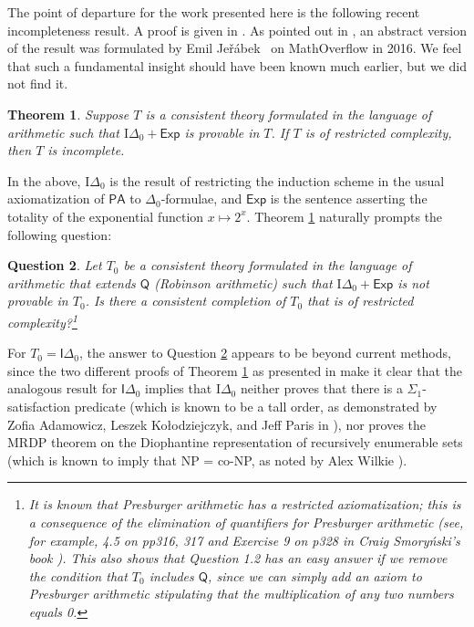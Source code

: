 \documentclass{amsart}
\newcommand{\qee} {\hspace*{2mm}\hfill \ding{109}}
\newtheorem{theorem}{Theorem}[section]
\newtheorem{jques}[theorem]{Question}
\newenvironment{jquestion}{\begin{jques} \rm}{\qee\end{jques}}
\newcommand{\jer}{Je\v{r}\'abek}
\newcommand{\skippy}{}
\begin{document}
\skippy
The point of departure for the work presented here is the following recent incompleteness result. A proof is given in \cite [Theorem B]{Enayat-Visser2024}. 
As pointed out in \cite {Enayat-Visser2024}, an abstract version of the result was formulated by Emil \jer~ on MathOverflow in 2016.
We feel that such a fundamental insight should have been known much earlier, but we did not find it.


\begin{theorem} \label{motivatingTheorem}  Suppose $T$ is a consistent theory formulated in the language of arithmetic such that $\mathrm{I}\Delta _{0}+\mathsf{Exp}$ is provable in $T$. If $T$ is of restricted complexity, then $T$ is incomplete.
\end{theorem}

\noindent In the above, $\mathrm{I}\Delta _{0}$ is the result of restricting the induction scheme in the usual axiomatization of $\mathsf{PA}$ to $\Delta _{0}$-formulae, and $\mathsf{Exp}$ is the sentence asserting the totality of the exponential function $x\mapsto 2^{x}$. Theorem \ref{motivatingTheorem} naturally prompts the following question: 

\begin{jquestion} \label{motivatingQ}
Let $T_{0}$ be a consistent  theory formulated in the language of
arithmetic that extends $\mathsf{Q}$ (Robinson arithmetic) such that  $\mathrm{I}\Delta _{0}+\mathsf{Exp}$ is not provable in 
$T_{0}$\textsf{.} Is there a consistent completion of $T_{0}$ that is of restricted complexity?\footnote{It is known that Presburger arithmetic has a restricted axiomatization; this is a consequence of the elimination of quantifiers for Presburger arithmetic (see, for example, 4.5 on pp316, 317 and Exercise 9 on p328 in Craig Smory\'nski's book \cite{Smorynski_Logical_NT}). This also shows that  Question 1.2 has an easy answer if we remove the condition that $T_0$ includes $\mathsf{Q}$, since we can simply add an axiom to Presburger arithmetic stipulating that the multiplication of any two numbers equals 0.}
\end{jquestion}

For $T_{0}=\mathsf{I}\Delta _{0}$, the answer to Question \ref{motivatingQ}  appears to be beyond 
current methods, since the two different proofs of Theorem \ref{motivatingTheorem} as presented in \cite{Enayat-Visser2024} make it clear that the analogous result for $\mathsf{I}\Delta _{0}$ implies that $\mathrm{I}\Delta _{0}$ neither proves 
that there is a $\Sigma _{1}$-satisfaction
predicate (which is known to be a tall order, as demonstrated by Zofia Adamowicz, Leszek Ko\l odziejczyk, and Jeff
Paris in \cite {adam:truth12}), nor proves the MRDP theorem on the Diophantine representation of recursively enumerable sets (which is known to imply that NP = co-NP, as noted by Alex Wilkie \cite{Wilkie-Delta_0-def}). 
\end{document}
